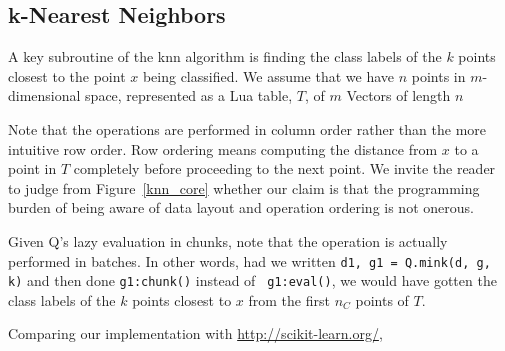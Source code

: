 \subsection{k-Nearest Neighbors}
\label{knn}

A key subroutine of the knn algorithm \cite{Hastie2009} is finding the class labels of the
\(k\) points closest to the point \(x\) being classified. 
We assume that we have \(n\) points in \(m\)-dimensional space, represented as a
Lua table, \(T\), of \(m\) Vectors of length \(n\)

Note that the operations are performed in column
order rather than the more intuitive row order. Row ordering means computing the
distance from \(x\) to a point in \(T\) completely before proceeding to the next
point. We invite the reader to judge from Figure~\ref{knn_core} whether 
our claim is that the programming burden of being aware of data layout and
operation ordering is not onerous.

Given Q's lazy evaluation in chunks, note that the operation is actually
performed in batches. In other words, had we written 
{\tt d1, g1 = Q.mink(d, g, k)} and then done {\tt g1:chunk()} instead  of {\tt
g1:eval()}, 
we would have gotten the class labels of the \(k\) points
closest to \(x\) from the first \(n_C\) points of \(T\). 


Comparing our implementation with \url{http://scikit-learn.org/}, \TBC

\begin{figure}[hbtp]
\centering
{}
\end{figure}


